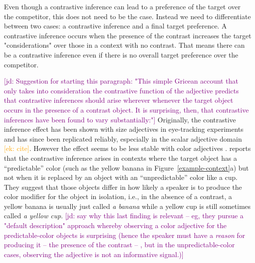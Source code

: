 \documentclass[10pt,letterpaper]{article}
\newcommand{\ek}[1]{\textcolor{Orange}{[ek: #1]}}
\newcommand{\jd}[1]{\textcolor{Purple}{[jd: #1]}}
\begin{document}
Even though a contrastive inference can lead to a preference of the target over the competitor, this does not need to be the case. Instead we need to differentiate between two cases: a contrastive inference and a final target preference. A contrastive inference occurs when the presence of the contrast increases the target "considerations" over those in a context with no contrast. That means there can be a contrastive inference even if there is no overall target preference over the competitor.

\jd{Suggestion for starting this paragraph: "This simple Gricean account that only takes into consideration the contrastive function of the adjective predicts that contrastive inferences should arise wherever whenever the target object occurs in the presence of a contrast object. It is surprising, then, that contrastive inferences have been found to vary substantially:"} Originally, the contrastive inference effect has been shown with size adjectives in eye-tracking experiments \cite{Sedivy:1999} and has since been replicated reliably, especially in the scalar adjective domain \ek{cite}. However the effect seems to be less stable with color adjectives \cite{Sedivy:2003}.  reports that the contrastive inference arises in contexts where the target object has a ``predictable'' color (such as the yellow banana in Figure~\ref{example-context}a) but not when it is replaced by an object with an ``unpredictable'' color like a cup. 
They suggest that those objects differ in how likely a speaker is to produce the color modifier for the object in isolation, i.e., in the absence of a contrast, a yellow banana is usually just called \textit{a banana} while a yellow cup is still sometimes called \textit{a yellow cup}. \jd{say why this last finding is relevant -- eg, they pursue a "default description" approach whereby observing a color adjective for the predictable-color objects is surprising (hence the speaker must have a \emph{reason} for producing it -- the presence of the contrast -- , but in the unpredictable-color cases, observing the adjective is not an informative signal.)}

\end{document}
